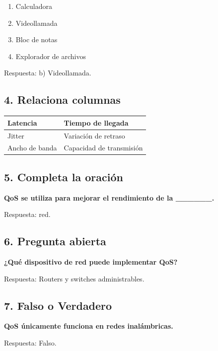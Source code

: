 \documentclass[12pt]{article}
\begin{document}
\begin{enumerate}[label=\alph*)]
    \item Calculadora
    \item Videollamada
    \item Bloc de notas
    \item Explorador de archivos
\end{enumerate}

Respuesta: b) Videollamada.

\vspace{0.5cm}

\subsection*{4. Relaciona columnas}

\begin{tabular}{|l|l|}
\hline
Latencia & Tiempo de llegada \\ \hline
Jitter & Variación de retraso \\ \hline
Ancho de banda & Capacidad de transmisión \\ \hline
\end{tabular}

\vspace{0.5cm}

\subsection*{5. Completa la oración}
\textbf{QoS se utiliza para mejorar el rendimiento de la \_\_\_\_\_\_.}

Respuesta: red.

\vspace{0.5cm}

\subsection*{6. Pregunta abierta}
\textbf{¿Qué dispositivo de red puede implementar QoS?}

Respuesta: Routers y switches administrables.

\vspace{0.5cm}

\subsection*{7. Falso o Verdadero}
\textbf{QoS únicamente funciona en redes inalámbricas.}

Respuesta: Falso.
\end{document}
